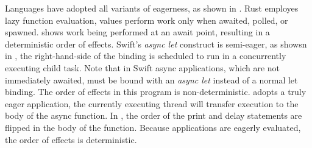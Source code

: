 Languages have adopted all variants of eagerness, as shown in . Rust employes lazy function evaluation, \Coro{} values perform work only when awaited, polled, or spawned.  shows work being performed at an await point, resulting in a deterministic order of effects. Swift's \textit{async let} construct is semi-eager, as showsn in , the right-hand-side of the binding is scheduled to run in a concurrently executing child task. Note that in Swift async applications, which are not immediately awaited, must be bound with an \textit{async let} instead of a normal let binding. The order of effects in this program is non-deterministic. \CSharp{} adopts a truly eager application, the currently executing thread will transfer execution to the body of the async function. In , the order of the print and delay statements are flipped in the body of the  function. Because applications are eagerly evaluated, the order of effects is deterministic.

